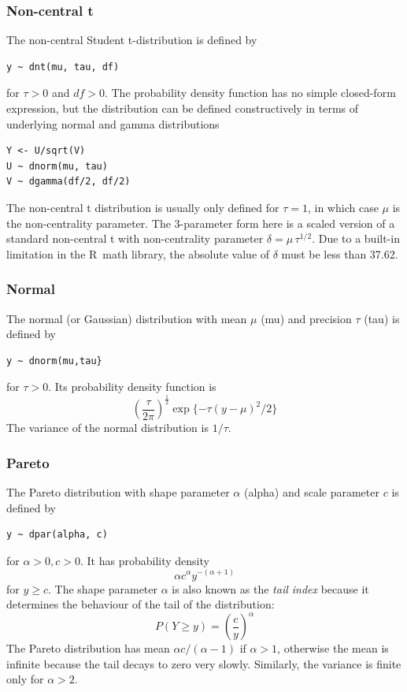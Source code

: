 \documentclass[11pt, a4paper, titlepage]{report}
\newcommand{\R}{\textsf{R}}
\begin{document}
{\subsubsection{Non-central t}
\label{bugs:dnt}

The non-central Student t-distribution is defined by
\begin{verbatim}
y ~ dnt(mu, tau, df)
\end{verbatim}
for $\tau > 0$ and $df > 0$. The probability density function has
no simple closed-form expression, but the distribution can be defined
constructively in terms of underlying normal and gamma distributions
\begin{verbatim}
Y <- U/sqrt(V)
U ~ dnorm(mu, tau)
V ~ dgamma(df/2, df/2)
\end{verbatim}
The non-central t distribution is usually only defined for $\tau = 1$,
in which case $\mu$ is the non-centrality parameter. The 3-parameter
form here is a scaled version of a standard non-central t with
non-centrality parameter $\delta = \mu \, \tau^{1/2}$. Due to a built-in
limitation in the \R\ math library, the absolute value of $\delta$ must
be less than 37.62.

\subsubsection{Normal}
\label{bugs:dnorm}

The normal (or Gaussian) distribution with mean $\mu$ (mu) and precision
$\tau$ (tau) is defined by
\begin{verbatim}
y ~ dnorm(mu,tau}
\end{verbatim}
for $\tau > 0$. Its probability density function is
\[
\left(\frac{\tau}{2\pi}\right)^{\frac{1}{2}} \exp\{- \tau (y - \mu)^2 / 2\}
\]
The variance of the normal distribution is $1/\tau$.


\subsubsection{Pareto}
\label{bugs:pareto}

The Pareto distribution with shape parameter $\alpha$ (alpha) and scale
parameter $c$ is defined by
\begin{verbatim}
y ~ dpar(alpha, c)
\end{verbatim}
for $\alpha > 0, c > 0$. It has probability density
\[
\alpha c^{\alpha} y^{-(\alpha + 1)}
\]
for $y \geq c$. The shape parameter $\alpha$ is also known as the {\em tail
  index} because it determines the behaviour of the tail of the
distribution:
\[
P(Y \geq y) = \left( \frac{c}{y} \right)^\alpha
\]
The Pareto distribution has mean $\alpha c/(\alpha-1)$ if $\alpha >
1$, otherwise the mean is infinite because the tail decays to zero
very slowly. Similarly, the variance is finite only for $\alpha > 2$.

}
\end{document}
